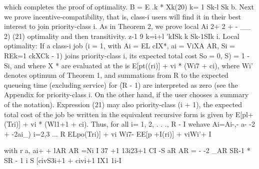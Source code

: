 \documentclass[10pt]{article}
\begin{document}
\begin{ReviewVerbatim}
                                                                    which completes the proof of optimality.
 B        =     E     .k    *     Xk(20)
       k= 1 Sk-l Sk                                                    b. Next we prove incentive-compatibility, that is,
                                                                    class-i users will find it in their best interest to join
                                                                    priority-class i. As in Theorem 2, we prove local
 Ai 2+ 2 + - __ 2) (21)                                             optimality and then transitivity.
         z-1 9 k=i+l 'kISk k Sk-1SIk
                                                                       i. Local optimality: If a class-i job (i = 1,
with Ai = EL cIX*, ai = ViXA AR, Si = REk=1     ckXCk
                                        - 1) joins priority-class i, its expected total cost
So = 0, S) = 1 - Si, and where X * are evaluated at the
                                                                     is E[pt((ri)] + vi * (Wi7 + ci), where Wi' denotes
optimum of Theorem 1, and summations from R to
                                                                    the expected queueing time (excluding service) for
(R - 1) are interpreted as zero (see the Appendix for
                                                                    priority-class i. On the other hand, if the user chooses
a summary of the notation). Expression (21) may also
                                                                    priority-class (i + 1), the expected total cost of the job
be written in the equivalent recursive form
                                                                     is given by E[pl+(Tri)] + vi * (Wl1+1 + ci). Thus, for
                                                                     all i= 1, 2, . . ., R - I wehave
Ai=Ai-,- a- -2 + -2ai_) i=2,3 ... R
                                                                     ELpo(Tri)] + vi Wi7- EE[p +I(ri)] + viWi'+ I

with                                                                            r a, ai+ + lAR AR
                                                                           =Ni I 37 +1 13i23+1 CI -S
           aR
AR = - -2                                                                   _AR
        SR-1 * SR
                                                                                          - 1 i S [civS3i+1 + civi+1 IX1 1i-I
\end{ReviewVerbatim}
\end{document}
